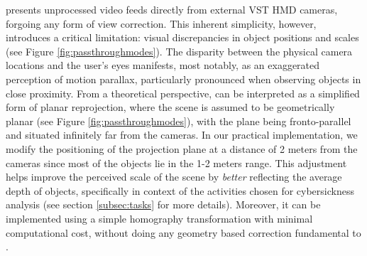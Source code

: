 
\DP presents unprocessed video feeds directly from external VST HMD cameras, forgoing any form of view correction. This inherent simplicity, however, introduces a critical limitation: visual discrepancies in object positions and scales (see Figure \ref{fig:passthroughmodes}). The disparity between the physical camera locations and the user's eyes manifests, most notably, as an exaggerated perception of motion parallax, particularly pronounced when observing objects in close proximity. 
From a theoretical perspective, \DP can be interpreted as a simplified form of planar reprojection, where the scene is assumed to be geometrically planar (see Figure \ref{fig:passthroughmodes}), with the plane being fronto-parallel and situated infinitely far from the cameras. In our practical implementation, we modify the positioning of the projection plane at a distance of 2 meters from the cameras since most of the objects lie in the 1-2 meters range. This adjustment helps improve the perceived scale of the scene by \emph{better} reflecting the average depth of objects, specifically in context of the activities chosen for cybersickness analysis (see section \ref{subsec:tasks} for more details). Moreover, it can be implemented using a simple homography transformation with minimal computational cost, without doing any geometry based correction fundamental to \DP.

